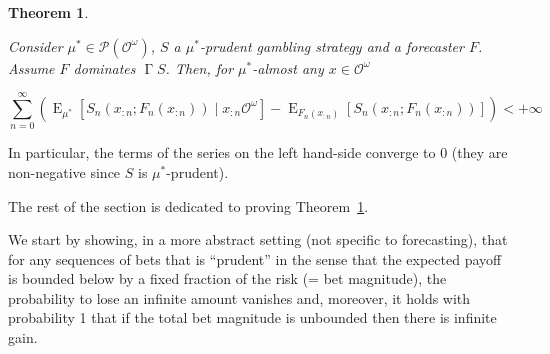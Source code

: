 \documentclass[11pt]{article}
\theoremstyle{definition}
\theoremstyle{plain}
\newtheorem{theorem}{Theorem}%
\DeclareMathOperator{\E}{E}
\newcommand{\PM}{\mathcal{P}}
\newcommand{\Ob}{\mathcal{O}}
\newcommand{\OO}{\Ob^\omega}
\newcommand{\PMO}{\PM(\OO)}
\DeclareMathOperator{\PG}{\Gamma}
\begin{document}
\begin{theorem}
\label{thm:prudent}

Consider $\mu^* \in \PMO$, $S$ a $\mu^*$-prudent gambling strategy and a forecaster $F$. Assume $F$ dominates $\PG{S}$. Then, for $\mu^*$-almost any $x \in \OO$

\begin{equation}
\label{eqn:thm_prudent}
\sum_{n=0}^\infty \left(\E_{\mu^*}\left[S_n\left(x_{:n};F_n\left(x_{:n}\right)\right) \mid x_{:n}\OO\right]-\E_{F_n\left(x_{:n}\right)}\left[S_n\left(x_{:n};F_n\left(x_{:n}\right)\right)\right]\right) < +\infty
\end{equation}

\end{theorem}

In particular, the terms of the series on the left hand-side converge to 0 (they are non-negative since $S$ is $\mu^*$-prudent).

The rest of the section is dedicated to proving Theorem~\ref{thm:prudent}.

We start by showing, in a more abstract setting (not specific to forecasting), that for any sequences of bets that is \enquote{prudent} in the sense that the expected payoff is bounded below by a fixed fraction of the risk (= bet magnitude), the probability to lose an infinite amount vanishes and, moreover, it holds with probability 1 that if the total bet magnitude is unbounded then there is infinite gain.
\end{document}
